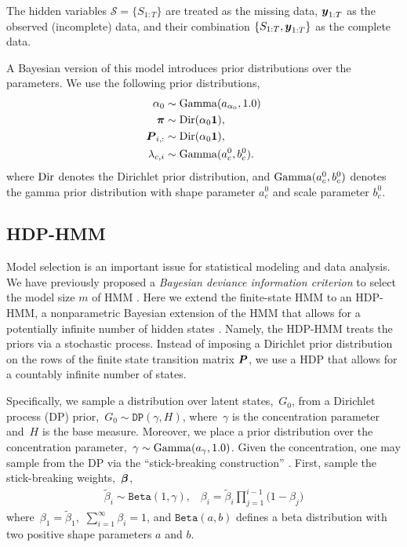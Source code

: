 The hidden variables $\mathcal{S}=\{S_{1:T}\}$ are treated as the missing data, ${\boldsymbol{y}}_{1:T}$ as the observed (incomplete) data, and  their combination $\{S_{1:T},{\boldsymbol{y}}_{1:T}\}$ as the complete data.

A Bayesian version of this model introduces prior distributions over the parameters. We use the following prior distributions,
\begin{align}
\alpha_0 &\sim \mathrm{Gamma}(a_{\alpha_0}, 1.0) \\
\nonumber \boldsymbol{\pi} &\sim \mathrm{Dir}(\alpha_0\boldsymbol{1}),\\
\nonumber \boldsymbol{P}_{i,:} &\sim \mathrm{Dir}(\alpha_0\boldsymbol{1}), \\
\nonumber \lambda_{c,i} &\sim \mathrm{Gamma}(a_c^0,b_c^0).
\end{align}
where $\mathrm{Dir}$ denotes the Dirichlet prior distribution, and $\mathrm{Gamma}(a_c^0,b_c^0)$ denotes the gamma prior distribution with 
shape parameter $a_c^0$ and scale parameter $b_c^0$.

\subsection{HDP-HMM}

Model selection is an important issue for statistical modeling and data analysis. 
We have previously proposed a {\em Bayesian deviance information criterion} to select the model size $m$  of HMM \citep{Chen12a,Chen14}. Here we extend the finite-state HMM to an HDP-HMM, a nonparametric Bayesian extension of the HMM that allows for a potentially infinite number of hidden states \citep{Teh06, Beal02}. Namely,  the HDP-HMM treats the priors via a stochastic process. Instead of imposing a Dirichlet prior distribution on the rows of the finite state transition matrix $\boldsymbol{P}$, we use a HDP that allows for a countably infinite number of states. 

Specifically, we sample a distribution over latent states,~$G_0$, from a Dirichlet process (DP) \citep{Ferguson73} prior,~${G_0\sim\texttt{DP}(\gamma,H)}$, where~$\gamma$ is the concentration parameter and~$H$ is the base measure. 
Moreover, we place a prior distribution over the concentration parameter,~$\gamma \sim \mathrm{Gamma}(a_{\gamma}, 1.0)$. 
Given the concentration, one may sample from the DP via the ``stick-breaking construction'' \citep{Sethuraman94}. First, sample the stick-breaking weights,~$\boldsymbol{\beta}$, 
\begin{eqnarray}                                   
\tilde{\beta}_{i}\sim \texttt{Beta}(1,\gamma), \;\;\; \beta_{i}=\tilde{\beta}_{i}\prod_{j=1}^{i-1}\Big(1-\beta_{j}\Big)
\label{stick1}
\end{eqnarray}
where~$\beta_1 = \tilde{\beta}_1$,~$\sum_{i=1}^\infty \beta_{i}=1$, and $\texttt{Beta}(a,b)$ defines a beta distribution with two positive shape parameters $a$ and $b$. 

